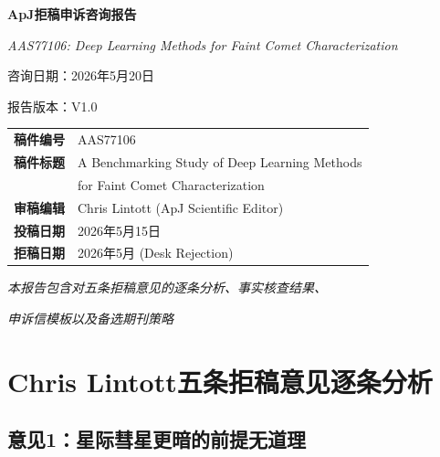 \documentclass[12pt,a4paper]{article}
\begin{document}
\begin{titlepage}
\centering
\vspace*{3cm}

{\Huge\bfseries ApJ拒稿申诉咨询报告}

\vspace{1.5cm}

{\Large\itshape AAS77106: Deep Learning Methods for Faint Comet Characterization}

\vspace{2cm}

{\large 咨询日期：2026年5月20日}

\vspace{1cm}

{\large 报告版本：V1.0}

\vspace{3cm}

\begin{tabular}{ll}
\textbf{稿件编号} & AAS77106 \\
\textbf{稿件标题} & A Benchmarking Study of Deep Learning Methods \\
& for Faint Comet Characterization \\
\textbf{审稿编辑} & Chris Lintott (ApJ Scientific Editor) \\
\textbf{投稿日期} & 2026年5月15日 \\
\textbf{拒稿日期} & 2026年5月 (Desk Rejection) \\
\end{tabular}

\vfill

{\large\itshape 本报告包含对五条拒稿意见的逐条分析、事实核查结果、}

{\large\itshape 申诉信模板以及备选期刊策略}

\end{titlepage}

\tableofcontents
\newpage

\section{Chris Lintott五条拒稿意见逐条分析}

\subsection{意见1：星际彗星更暗的前提无道理}
\end{document}
